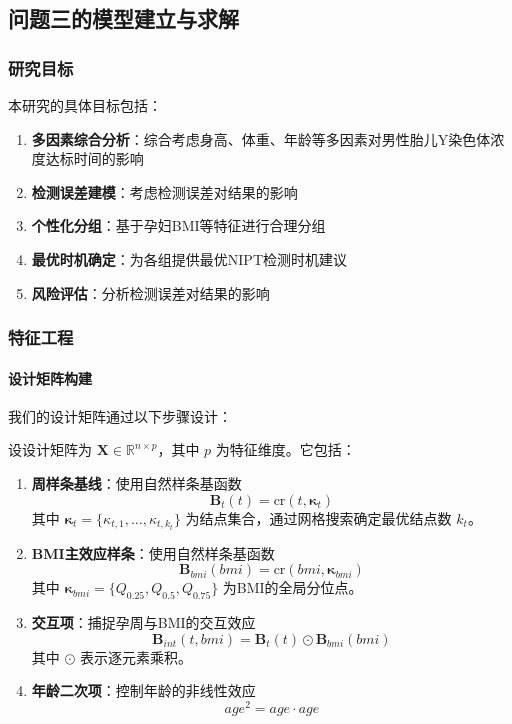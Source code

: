 \documentclass[12pt,a4paper]{ctexart}
\numberwithin{equation}{section}
\theoremstyle{mcm}
\begin{document}
\subsection{问题三的模型建立与求解}

\subsubsection{研究目标}
本研究的具体目标包括：

\begin{enumerate}
\item \textbf{多因素综合分析}：综合考虑身高、体重、年龄等多因素对男性胎儿Y染色体浓度达标时间的影响
\item \textbf{检测误差建模}：考虑检测误差对结果的影响
\item \textbf{个性化分组}：基于孕妇BMI等特征进行合理分组
\item \textbf{最优时机确定}：为各组提供最优NIPT检测时机建议
\item \textbf{风险评估}：分析检测误差对结果的影响
\end{enumerate}
\subsubsection{特征工程}

\paragraph{设计矩阵构建}
我们的设计矩阵通过以下步骤设计：

设设计矩阵为 $\mathbf{X} \in \mathbb{R}^{n \times p}$，其中 $p$ 为特征维度。它包括：

\begin{enumerate}
\item \textbf{周样条基线}：使用自然样条基函数
   $$\mathbf{B}_t(t) = \text{cr}(t, \boldsymbol{\kappa}_t)$$
   其中 $\boldsymbol{\kappa}_t = \{\kappa_{t,1}, \ldots, \kappa_{t,k_t}\}$ 为结点集合，通过网格搜索确定最优结点数 $k_t$。

\item \textbf{BMI主效应样条}：使用自然样条基函数
   $$\mathbf{B}_{bmi}(bmi) = \text{cr}(bmi, \boldsymbol{\kappa}_{bmi})$$
   其中 $\boldsymbol{\kappa}_{bmi} = \{Q_{0.25}, Q_{0.5}, Q_{0.75}\}$ 为BMI的全局分位点。

\item \textbf{交互项}：捕捉孕周与BMI的交互效应
   $$\mathbf{B}_{int}(t, bmi) = \mathbf{B}_t(t) \odot \mathbf{B}_{bmi}(bmi)$$
   其中 $\odot$ 表示逐元素乘积。

\item \textbf{年龄二次项}：控制年龄的非线性效应
   $$age^2 = age \cdot age$$
\end{enumerate}
\end{document}
